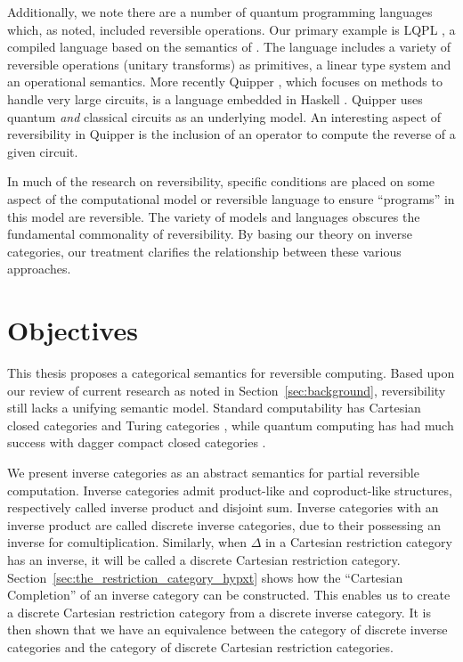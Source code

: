 Additionally, we note there are a number of quantum programming languages which, as noted, included
reversible operations. Our primary example is LQPL \cite{giles2007}, a compiled language based on the
semantics of \cite{selinger04:qpl}. The language includes a variety of reversible operations
(unitary transforms) as primitives, a linear type system and an operational semantics. More recently
Quipper \cite{green2013introduction,green2013quipper}, which focuses on methods to handle very large
circuits, is a language embedded in Haskell \cite{peyton2003:haskell98}. Quipper uses quantum
\emph{and} classical circuits as an underlying model. An interesting aspect of reversibility in
Quipper is the inclusion of an operator to compute the reverse of a given circuit.

In much of the research on reversibility, specific conditions are placed on some aspect of the
computational model or reversible language to ensure ``programs'' in this model are reversible.
The variety of models and languages obscures the fundamental commonality of reversibility.
By basing our theory on inverse categories, our treatment clarifies the relationship
between these various approaches.


\section{Objectives}
\label{sec:objectives}

This thesis proposes a categorical semantics for reversible computing. Based upon our review of
current research as noted in Section~\ref{sec:background}, reversibility still lacks a unifying
semantic model. Standard computability has Cartesian closed categories \cite{barr:ctcs} and Turing
categories \cite{cockett-hostra08-intro-to-turing}, while quantum computing has had much success
with dagger compact closed categories
\cite{selinger04:towardssemantics,selinger05:dagger,abramsky05:abstractscalars}.

We present inverse categories as an abstract semantics for partial reversible computation.
Inverse categories admit product-like and coproduct-like structures, respectively called
inverse product and disjoint sum. Inverse categories with an inverse product are called discrete
inverse categories, due to their possessing an inverse for comultiplication. Similarly, when
$\Delta$ in a Cartesian restriction category has an inverse, it will be called a discrete Cartesian
restriction category. Section~\ref{sec:the_restriction_category_hypxt} shows how the ``Cartesian
Completion'' of an inverse category can be constructed. This enables us to create a discrete
Cartesian restriction category from a discrete inverse category. It is then shown that we have an
equivalence between the category of discrete inverse categories and the category of discrete
Cartesian restriction categories.

